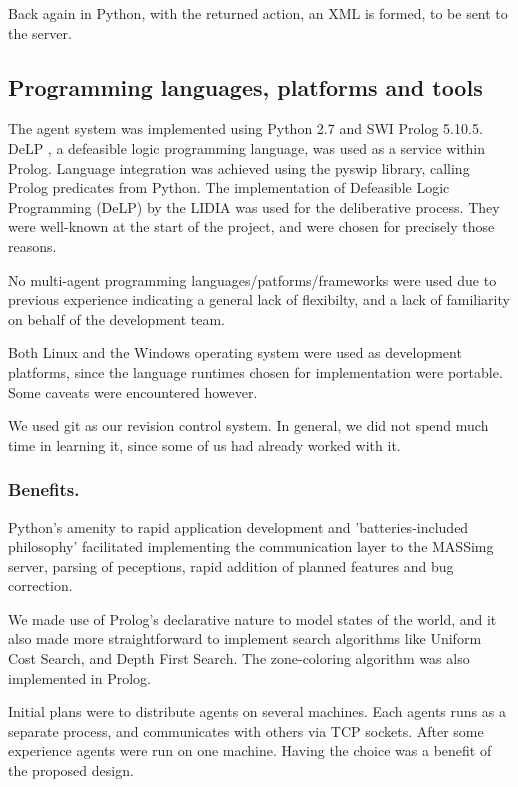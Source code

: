 \documentclass{llncs2e/llncs}
\begin{document}
    Back again in Python, with the returned action, an XML is formed, to be sent 
    to the server.

\subsection{Programming languages, platforms and tools}

    The agent system was implemented using Python 2.7 and SWI Prolog 5.10.5. DeLP 
    \cite{Garcia:2004a}, a defeasible logic programming language, was used as a 
    service within Prolog. 
    Language integration was achieved using the pyswip library, calling Prolog 
    predicates from Python. The implementation of Defeasible Logic Programming 
    (DeLP) by the LIDIA was used for the deliberative process. They were 
    well-known at the start of the project, and were chosen for precisely those
    reasons.

    No multi-agent programming languages/patforms/frameworks were used due to 
    previous experience indicating a general lack of flexibilty, and a lack of 
    familiarity on behalf of the development team.
    
    Both Linux and the Windows operating system were used as development 
    platforms, since the language runtimes chosen for implementation were 
    portable. Some caveats were encountered however.

    We used git as our revision control system. In general, we did not spend much 
    time in learning it, since some of us had already worked with it.

\subsubsection{Benefits.}
    
    Python's amenity to rapid application development and 'batteries-included 
    philosophy' facilitated implementing the communication layer to the MASSimg 
    server, parsing of peceptions, rapid addition of planned features and bug 
    correction.

    We made use of Prolog's declarative nature to model states of the world, and it 
    also made more straightforward to implement search algorithms like Uniform Cost 
    Search, and Depth First Search. The zone-coloring algorithm was also 
    implemented in Prolog.

    Initial plans were to distribute agents on several machines. Each agents runs 
    as a separate process, and communicates with others via TCP sockets. After 
    some experience agents were run on one machine. Having the choice was a 
    benefit of the proposed design.
\end{document}
